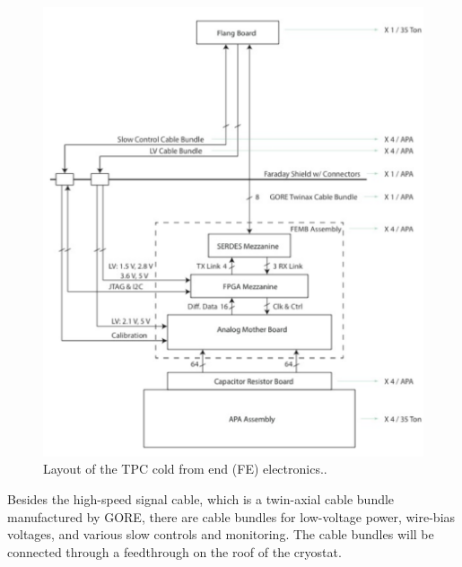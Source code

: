 \begin{figure}[htb]
\centering
\begin{minipage}[b]{1.0\textwidth}
\begin{center}
\includegraphics[width=.75\textwidth]{figures/fe-electronics-block-diagram.pdf}
\end{center}
\end{minipage}
\caption{Layout of the TPC cold from end (FE) electronics..}
\label{fig:coldelec}
\end{figure}


Besides the high-speed signal cable, which is a twin-axial cable bundle manufactured by GORE,
there are cable bundles for low-voltage power, wire-bias voltages, and various slow controls and monitoring.
The  cable bundles will be connected through a feedthrough on the roof of the cryostat. 



